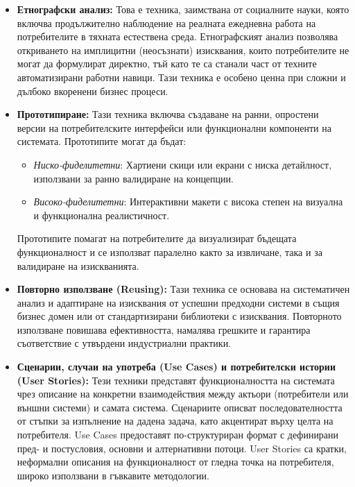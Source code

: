 \documentclass{scrartcl}
\begin{document}
\begin{FlushLeft}
\begin{itemize}
    \item \textbf{Етнографски анализ:} Това е техника, заимствана от социалните науки, която включва продължително наблюдение на реалната ежедневна работа на потребителите в тяхната естествена среда. Етнографският анализ позволява откриването на имплицитни (неосъзнати) изисквания, които потребителите не могат да формулират директно, тъй като те са станали част от техните автоматизирани работни навици. Тази техника е особено ценна при сложни и дълбоко вкоренени бизнес процеси.
    
    \item \textbf{Прототипиране:} Тази техника включва създаване на ранни, опростени версии на потребителските интерфейси или функционални компоненти на системата. Прототипите могат да бъдат:
    \begin{itemize}
        \item \textit{Ниско-фиделитетни}: Хартиени скици или екрани с ниска детайлност, използвани за ранно валидиране на концепции.
        \item \textit{Високо-фиделитетни}: Интерактивни макети с висока степен на визуална и функционална реалистичност.
    \end{itemize}
    Прототипите помагат на потребителите да визуализират бъдещата функционалност и се използват паралелно както за извличане, така и за валидиране на изискванията.
    
    \item \textbf{Повторно използване (Reusing):} Тази техника се основава на систематичен анализ и адаптиране на изисквания от успешни предходни системи в същия бизнес домен или от стандартизирани библиотеки с изисквания. Повторното използване повишава ефективността, намалява грешките и гарантира съответствие с утвърдени индустриални практики.
    
    \item \textbf{Сценарии, случаи на употреба (Use Cases) и потребителски истории (User Stories):} Тези техники представят функционалността на системата чрез описание на конкретни взаимодействия между актьори (потребители или външни системи) и самата система. Сценариите описват последователността от стъпки за изпълнение на дадена задача, като акцентират върху целта на потребителя. Use Cases предоставят по-структуриран формат с дефинирани пред- и постусловия, основни и алтернативни потоци. User Stories са кратки, неформални описания на функционалност от гледна точка на потребителя, широко използвани в гъвкавите методологии.
\end{itemize}


\end{FlushLeft}
\end{document}

